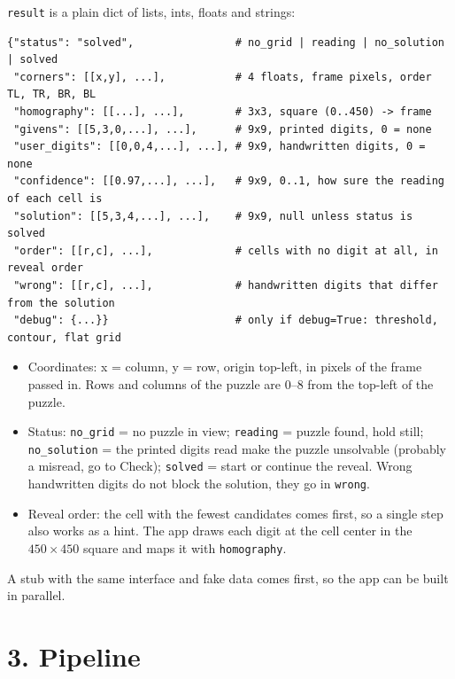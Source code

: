 \documentclass[10pt]{article}
\begin{document}
\texttt{result} is a plain dict of lists, ints, floats and strings:
\begin{verbatim}
{"status": "solved",                # no_grid | reading | no_solution | solved
 "corners": [[x,y], ...],           # 4 floats, frame pixels, order TL, TR, BR, BL
 "homography": [[...], ...],        # 3x3, square (0..450) -> frame
 "givens": [[5,3,0,...], ...],      # 9x9, printed digits, 0 = none
 "user_digits": [[0,0,4,...], ...], # 9x9, handwritten digits, 0 = none
 "confidence": [[0.97,...], ...],   # 9x9, 0..1, how sure the reading of each cell is
 "solution": [[5,3,4,...], ...],    # 9x9, null unless status is solved
 "order": [[r,c], ...],             # cells with no digit at all, in reveal order
 "wrong": [[r,c], ...],             # handwritten digits that differ from the solution
 "debug": {...}}                    # only if debug=True: threshold, contour, flat grid
\end{verbatim}

\begin{itemize}
  \item Coordinates: x = column, y = row, origin top-left, in pixels of the frame passed in.
        Rows and columns of the puzzle are 0--8 from the top-left of the puzzle.
  \item Status: \texttt{no\_grid} = no puzzle in view; \texttt{reading} = puzzle found, hold
        still; \texttt{no\_solution} = the printed digits read make the puzzle unsolvable
        (probably a misread, go to Check); \texttt{solved} = start or continue the reveal.
        Wrong handwritten digits do not block the solution, they go in \texttt{wrong}.
  \item Reveal order: the cell with the fewest candidates comes first, so a single step also
        works as a hint. The app draws each digit at the cell center in the $450\times450$ square
        and maps it with \texttt{homography}.
\end{itemize}

A stub with the same interface and fake data comes first, so the app can be built in parallel.

\section*{3. Pipeline}
\end{document}
